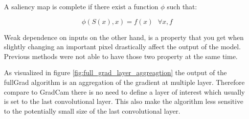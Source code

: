 A saliency map is complete if there exist a function $\phi$ such that:

$$\phi(S(x), x) = f(x) \text{ } \forall x,f$$

Weak dependence on inputs on the other hand, is a property that you get when slightly changing an important pixel drastically affect the output of the model. Previous methods were not able to have those two property at the same time.

As visualized in figure \ref{fig:full_grad_layer_aggreagtion} the output of the fullGrad algorithm is an aggregation of the gradient at multiple layer. Therefore compare to GradCam there is no need to define a layer of interest which usually is set to the last convolutional layer. This also make the algorithm less sensitive to the potentially small size of the last convolutional layer.